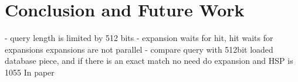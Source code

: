 \section{Conclusion and Future Work}
\label{sec:concl}


 - query length is limited by 512 bits
 - expansion waits for hit, hit waits for expansions expansions are not parallel
- compare query with 512bit loaded database piece, and if there is an exact match no need do expansion and HSP is 1055
In paper \cite{vipin2019}